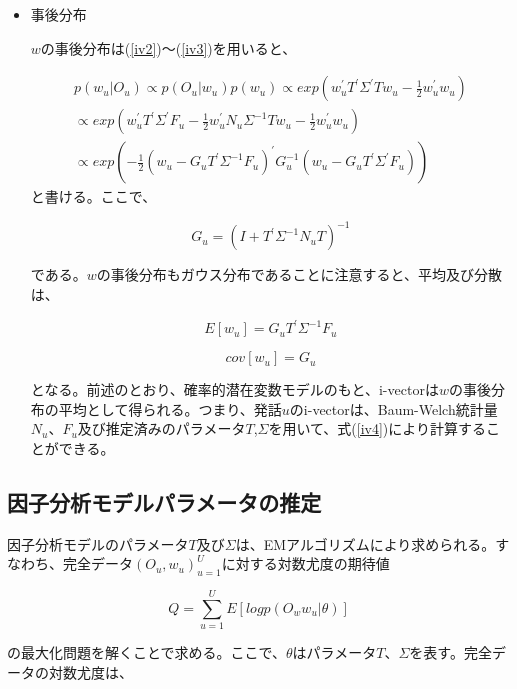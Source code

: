 \begin{itemize}
\item 事後分布\par
$w$の事後分布は(\ref{iv2})〜(\ref{iv3})を用いると、

\begin{equation}
\begin{split}
p(w_u|O_u)\propto p(O_u|w_u)p(w_u)\propto exp(w_u^\prime T^\prime \Sigma^\prime Tw_u-\frac{1}{2}w_u^\prime w_u)\\ \propto exp(w_u^\prime T^\prime \Sigma^\prime F_u-\frac{1}{2}w_u^\prime N_u\Sigma^{-1}Tw_u-\frac{1}{2}w_u^\prime w_u)\\ \propto exp(-\frac{1}{2}(w_u-G_uT^\prime\Sigma^{-1}F_u)^\prime G_u^{-1}(w_u-G_uT^\prime \Sigma^\prime F_u))
\end{split}
\end{equation}
と書ける。ここで、

\begin{equation}
G_u=(I+T^\prime \Sigma^{-1}N_u T)^{-1}
\end{equation}

である。$w$の事後分布もガウス分布であることに注意すると、平均及び分散は、

\begin{equation}
\label{iv4}
E[w_u]=G_uT^\prime \Sigma^{-1}F_u
\end{equation}

\begin{equation}
cov[w_u]=G_u
\end{equation}

となる。前述のとおり、確率的潜在変数モデルのもと、i-vectorは$w$の事後分布の平均として得られる。つまり、発話$u$のi-vectorは、Baum-Welch統計量$N_u$、$F_u$及び推定済みのパラメータ$T$,$\Sigma$を用いて、式(\ref{iv4})により計算することができる。

\end{itemize}


\subsection{因子分析モデルパラメータの推定}
因子分析モデルのパラメータ$T$及び$\Sigma$は、EMアルゴリズムにより求められる。すなわち、完全データ${(O_u,w_u)}_{u=1}^{U}$に対する対数尤度の期待値

\begin{equation}
\label{iv5}
Q=\sum_{u=1}^{U}E[log p(O_ww_u|\theta)]
\end{equation}

の最大化問題を解くことで求める。ここで、$\theta$はパラメータ$T$、$\Sigma$を表す。完全データの対数尤度は、

